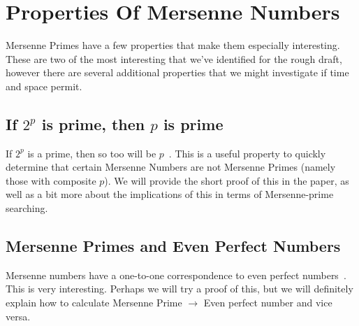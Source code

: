 \section{Properties Of Mersenne Numbers}

Mersenne Primes have a few properties that make them especially interesting. These are two of the most interesting that we've identified for the rough draft, however there are several additional properties that we might investigate if time and space permit.

\subsection{If $2^p$ is prime, then $p$ is prime}
If $2^p$ is a prime, then so too will be $p$~\cite{LighNeal}. 
This is a useful property to quickly determine that certain Mersenne Numbers are not Mersenne Primes (namely those with composite $p$). 
We will provide the short proof of this in the paper, as well as a bit more about the
implications of this in terms of Mersenne-prime searching.

\subsection{Mersenne Primes and Even Perfect Numbers}
Mersenne numbers have a one-to-one correspondence to even perfect numbers~\cite{utm.edu}. This is very interesting. Perhaps we will try a proof of this, but we will definitely explain how to calculate Mersenne Prime $\to$ Even perfect number and vice versa.

